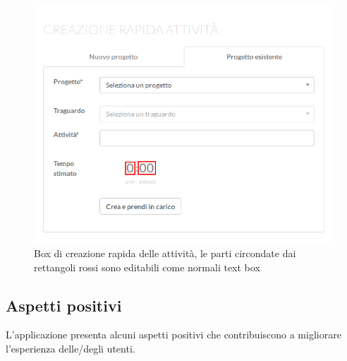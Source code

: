 \begin{itemize}
\begin{itemize}
	\begin{figure}[H]\label{imgCreazioneAttivita}
	\centering
	\includegraphics[width=.8\columnwidth]{images/creazioneAttivita.png}
	\caption{Box di creazione rapida delle attività, le parti circondate dai rettangoli rossi sono editabili come normali text box}
	\end{figure}
		
	\end{itemize}
\end{itemize}

\subsection{Aspetti positivi}
L'applicazione presenta alcuni aspetti positivi che contribuiscono a migliorare l'esperienza
delle/degli utenti.

